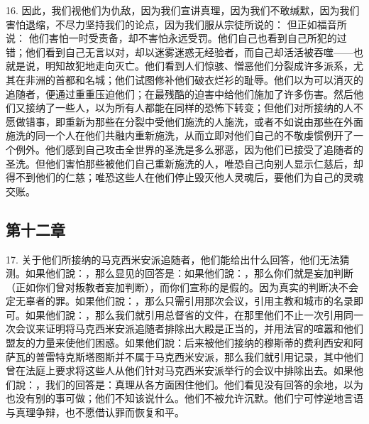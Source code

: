 16. 因此，我们视他们为仇敌，因为我们宣讲真理，因为我们不敢缄默，因为我们害怕退缩，不尽力坚持我们的论点，因为我们服从宗徒所说的： 但正如福音所说： 他们害怕一时受责备，却不害怕永远受罚。他们自己也看到自己所犯的过错；他们看到自己无言以对，却以迷雾迷惑无经验者，而自己却活活被吞噬——也就是说，明知故犯地走向灭亡。他们看到人们惊骇、憎恶他们分裂成许多派系，尤其在非洲的首都和名城；他们试图修补他们破衣烂衫的耻辱。他们以为可以消灭的追随者，便通过重重压迫他们；在最残酷的迫害中给他们施加了许多伤害。然后他们又接纳了一些人，以为所有人都能在同样的恐怖下转变；但他们对所接纳的人不愿做错事，即重新为那些在分裂中受他们施洗的人施洗，或者不如说由那些在外面施洗的同一个人在他们共融内重新施洗，从而立即对他们自己的不敬虔惯例开了一个例外。他们感到自己攻击全世界的圣洗是多么邪恶，因为他们已接受了追随者的圣洗。但他们害怕那些被他们自己重新施洗的人，唯恐自己向别人显示仁慈后，却得不到他们的仁慈；唯恐这些人在他们停止毁灭他人灵魂后，要他们为自己的灵魂交账。\par


\subsection{第十二章}

17. 关于他们所接纳的马克西米安派追随者，他们能给出什么回答，他们无法猜测。如果他们說：，那么显见的回答是：如果他们說：，那么你们就是妄加判断（正如你们曾对叛教者妄加判断），而你们宣称的是假的。因为真实的判断决不会定无辜者的罪。如果他们說：，那么只需引用那次会议，引用主教和城市的名录即可。如果他们說：，那么我们就引用总督省的文件，在那里他们不止一次引用同一次会议来证明将马克西米安派追随者排除出大殿是正当的，并用法官的喧嚣和他们盟友的力量来使他们困惑。如果他们說：后来被他们接纳的穆斯蒂的费利西安和阿萨瓦的普雷特克斯塔图斯并不属于马克西米安派，那么我们就引用记录，其中他们曾在法庭上要求将这些人从他们针对马克西米安派举行的会议中排除出去。如果他们說：，我们的回答是：真理从各方面困住他们。他们看见没有回答的余地，以为也没有别的事可做；他们不知该说什么。他们不被允许沉默。他们宁可悖逆地言语与真理争辩，也不愿借认罪而恢复和平。\par

